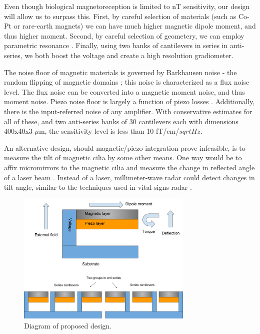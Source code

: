  Even though biological magnetoreception is limited to nT sensitivity, our design will allow us to surpass this. First, by careful selection of materials (such as Co-Pt or rare-earth magnets) \cite{coey2010magnetism, arnold2009permanent} we can have much higher magnetic dipole moment, and thus higher moment. Second, by careful selection of geometery, we can employ parametric resonance \cite{van2006resonant}. Finally, using two banks of cantilevers in series in anti-series, we both boost the voltage and create a high resolution gradiometer.

 The noise floor of magnetic materials is governed by Barkhausen noise - the random flipping of magnetic domains \cite{butta2012sources}; this noise is characterized as a flux noise level. The flux noise can be converted into a magnetic moment noise, and thus moment noise. Piezo noise floor is largely a function of piezo losses \cite{levinzon2004fundamental}. Additionally, there is the input-referred noise of any amplifier. With conservative estimates for all of these, and two anti-series banks of 30 cantilevers each with dimensions 400x40x3 $\mu$m, the sensitivity level is less than 10 fT/cm/$sqrt{Hz}$.

 An alternative design, should magnetic/piezo integration prove infeasible, is to measure the tilt of magnetic cilia  by some other means. One way would be to affix micromirrors to the magnetic cilia and measure the change in reflected angle of a laser beam \cite{duan2016optical}. Instead of a laser, millimeter-wave radar could detect changes in tilt angle, similar to the techniques used in vital-signs radar \cite{li2013review}.
 
\begin{figure}
\centering
\includegraphics[width=0.75\textwidth]{biomag}
\caption{Diagram of proposed design.}
\label{fig:diagram}
\end{figure}

